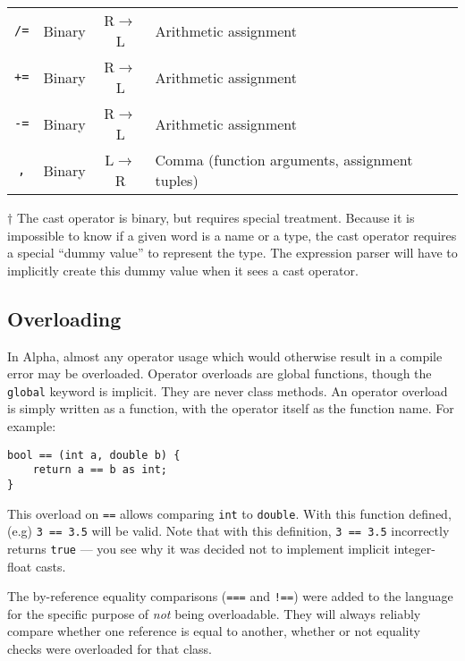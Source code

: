 \documentclass{article}
\begin{document}
\begin{center}
\begin{threeparttable}
\begin{tabular}{|c|c|c|l|}
      \texttt{/=} & Binary & R$\to$L & Arithmetic assignment \\
      \texttt{+=} & Binary & R$\to$L & Arithmetic assignment \\
      \texttt{-=} & Binary & R$\to$L & Arithmetic assignment \\ \hline
      \texttt{,} & Binary & L$\to$R & Comma (function arguments, assignment tuples) \\ \hline
    \end{tabular}
    \begin{tablenotes}
      \item{$\dagger$ \small{The cast operator is binary, but requires special treatment.
          Because it is impossible to know if a given word is a name or a type, the
          cast operator requires a special ``dummy value'' to represent the type. The
          expression parser will have to implicitly create this dummy value when it sees
          a cast operator.}}
    \end{tablenotes}
  \end{threeparttable}
\end{center}

\subsection{Overloading}
\label{sub:operators:overloading}

In Alpha, almost any operator usage which would otherwise result in a compile
error
may be overloaded. Operator overloads are global functions, though the
\texttt{global} keyword is implicit. They are never class methods. An operator
overload is simply written as a function, with the operator itself as the
function name. For example:

\begin{verbatim}
bool == (int a, double b) {
    return a == b as int;
}
\end{verbatim}

This overload on \texttt{==} allows comparing \texttt{int} to \texttt{double}.
With this function defined, (e.g) \texttt{3 == 3.5} will be valid. Note that
with this definition, \texttt{3 == 3.5} incorrectly returns \texttt{true}
--- you see why it was decided not to implement implicit integer-float casts.

The by-reference equality comparisons (\texttt{===} and \texttt{!==}) were
added to the language for the specific purpose of \emph{not} being
overloadable. They will always reliably compare whether one reference is equal
to another, whether or not equality checks were overloaded for that class.
\end{document}
